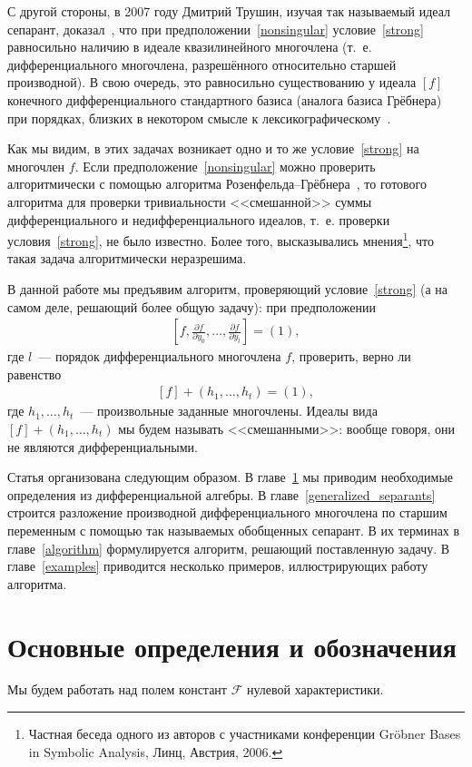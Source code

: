 \documentclass[11pt]{article}
\newcommand{\diffField}{\mathcal{F}}
\theoremstyle{plain}
\theoremstyle{definition}
\theoremstyle{remark}
\begin{document}
С другой стороны, в 2007 году Дмитрий Трушин, изучая так называемый идеал сепарант, доказал~\cite{Trushin},
что при предположении~\eqref{nonsingular} условие~\eqref{strong} равносильно наличию в идеале квазилинейного многочлена
(т.~е. дифференциального многочлена, разрешённого относительно старшей производной).
В свою очередь, это равносильно существованию у идеала $[f]$ конечного дифференциального стандартного базиса (аналога базиса Грёбнера)
при порядках, близких в некотором смысле к лексикографическому~\cite{Zobnin}.

Как мы видим, в этих задачах возникает одно и то же условие~\eqref{strong} на многочлен $f$.
Если предположение~\eqref{nonsingular} можно проверить алгоритмически с помощью алгоритма Розенфельда--Грёбнера~\cite{BLOP, Sit},
то готового алгоритма для проверки тривиальности <<смешанной>> суммы дифференциального и недифференциального идеалов, т.~е. проверки условия~\eqref{strong}, не было известно.
Более того, высказывались мнения\footnote{Частная беседа одного из авторов с участниками конференции Gr\"obner Bases in Symbolic Analysis, Линц, Австрия, 2006.}, что такая задача алгоритмически неразрешима.

В данной работе мы предъявим алгоритм, проверяющий условие~\eqref{strong} (а на самом деле, решающий более общую задачу):
при предположении
\begin{gather}
\left[f, \frac{\partial f}{\partial y_0}, \ldots, \frac{\partial f}{\partial y_l} \right] = (1),
\end{gather}
где $l$~--- порядок дифференциального многочлена $f$,
проверить, верно ли равенство
\begin{gather}
\label{strong_general}
[f] + (h_1, \ldots, h_t) = (1),
\end{gather}
где $h_1, \ldots, h_t$~--- произвольные заданные многочлены.
Идеалы вида $[f] + (h_1, \ldots, h_t)$ мы будем называть <<смешанными>>: вообще говоря, они не являются дифференциальными.

Статья организована следующим образом. В главе~\ref{preliminaries} мы приводим необходимые определения из дифференциальной алгебры.
В главе~\ref{generalized_separants} строится разложение производной дифференциального многочлена по старшим переменным
с помощью так называемых обобщенных сепарант. В их терминах в главе~\ref{algorithm} формулируется алгоритм,
решающий поставленную задачу. В главе~\ref{examples} приводится несколько примеров, иллюстрирующих работу алгоритма.



\section{Основные определения и обозначения}
\label{preliminaries}
Мы будем работать над полем констант $\diffField$ нулевой характеристики.
\end{document}
